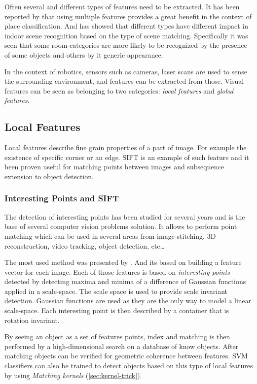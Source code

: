 Often several and different types of features need to be extracted. It has been
reported by \cite{pronobis2010ijrr} that using multiple features provides a
great benefit in the context of place classification.
And \cite{quattoni2009recognizing} has showed that different types have
different impact in indoor scene recognition based on the type of scene
matching. Specifically it was seen that some room-categories are more likely to be
recognized by the presence of some objects and others by it generic appearance.

In the context of robotics, sensors such as cameras, laser scans are used to
sense the surrounding environment, and features can be extracted from those.
Visual features can be seen as belonging to two categories:
\emph{local features} and \emph{global features}.


\subsection{Local Features}
\label{sec:local-features}
Local features describe fine grain properties of a part of image.
For example the existence of specific corner or an edge. \Gls{SIFT}
is an example of such feature and it been proven useful
for matching points between images and subsequence extension to object detection.

\subsubsection*{Interesting Points and SIFT}
\label{sec:sift}
The detection of interesting points has been studied for several years and is
the base of several computer vision problems solution. It allows to perform
point matching which can be used in several areas from image stitching,
3D reconstruction, video tracking, object detection, etc\dots

The most used method was presented by \cite{lowe1999object}. And its based on
building a feature vector for each image. Each of those features is based on
\emph{interesting points} detected by detecting maxima and minima of a
difference of Gaussian functions applied in a scale-space.
The scale space is used to provide scale invariant detection. Gaussian functions
are used as they are the only way to model a linear scale-space.
Each interesting point is then described by a container that is rotation
invariant.

By seeing an object as a set of features points, index and matching is then
performed by a high-dimensional search on a database of know objects. After
matching objects can be verified for geometric coherence between features.
\Gls{SVM} classifiers can also be trained to detect objects based on this type
of local features by using \emph{Matching kernels} (\autoref{sec:kernel-trick}).

